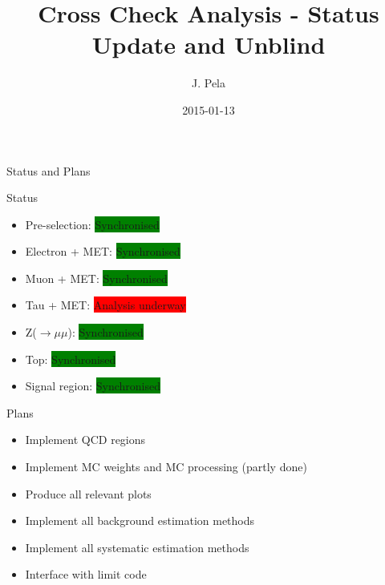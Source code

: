 \documentclass[8pt]{beamer}
\author[J. Pela]{J. Pela}
\title{Cross Check Analysis - Status Update and Unblind}
\institute[ICL]{Imperial College London}
\date{2015-01-13}
\begin{document}
\begin{frame}
  \titlepage
\end{frame}

\begin{frame}{Status and Plans}

\begin{block}{Status}

\begin{itemize}
  \item Pre-selection: \colorbox{green}{Synchronised}
  \item Electron + MET: \colorbox{green}{Synchronised}
  \item Muon + MET: \colorbox{green}{Synchronised}
  \item Tau + MET: \colorbox{red}{Analysis underway}
  \item Z($\rightarrow\mu\mu$): \colorbox{green}{Synchronised}
  \item Top: \colorbox{green}{Synchronised}
  \item Signal region: \colorbox{green}{Synchronised}
\end{itemize}

\end{block}

\begin{block}{Plans}
 
\begin{itemize}
  \item Implement QCD regions
  \item Implement MC weights and MC processing (partly done)
  \item Produce all relevant plots
  \item Implement all background estimation methods
  \item Implement all systematic estimation methods
  \item Interface with limit code
\end{itemize}
 
\end{block}

\end{frame}
\end{document}
